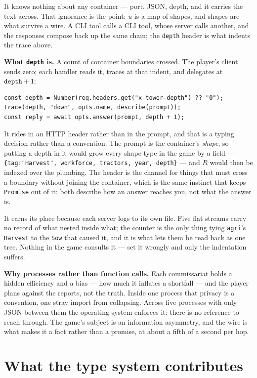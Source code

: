 \documentclass[11pt,a4paper]{article}
\newcommand{\note}[1]{\medskip\noindent\textbf{\textcolor{warn}{#1}}\quad}
\begin{document}
\noindent It knows nothing about any container --- port, JSON, depth, and it
carries the text across. That ignorance is the point: $u$ is a map of shapes,
and shapes are what survive a wire. A CLI tool calls a CLI tool, whose server
calls another, and the responses compose back up the same chain; the
\texttt{depth} header is what indents the trace above.

\note{What \texttt{depth} is.} A count of container boundaries crossed. The
player's client sends zero; each handler reads it, traces at that indent, and
delegates at $\texttt{depth}+1$:

\begin{lstlisting}
const depth = Number(req.headers.get("x-tower-depth") ?? "0");
trace(depth, "down", opts.name, describe(prompt));
const reply = await opts.answer(prompt, depth + 1);
\end{lstlisting}

\noindent It rides in an HTTP header rather than in the prompt, and that is a
typing decision rather than a convention. The prompt is the container's
\emph{shape}, so putting a depth in it would grow every shape type in the game
by a field --- \texttt{\{tag:"Harvest", workforce, tractors, year, depth\}} ---
and $R$ would then be indexed over the plumbing. The header is the channel for
things that must cross a boundary without joining the container, which is the
same instinct that keeps \texttt{Promise} out of it: both describe how an answer
reaches you, not what the answer is.

It earns its place because each server logs to its own file. Five flat streams
carry no record of what nested inside what; the counter is the only thing tying
\texttt{agri}'s \texttt{Harvest} to the \texttt{Sow} that caused it, and it is
what lets them be read back as one tree. Nothing in the game consults it ---
set it wrongly and only the indentation suffers.

\note{Why processes rather than function calls.} Each commissariat holds a
hidden efficiency and a bias --- how much it inflates a shortfall --- and the
player plans against the reports, not the truth. Inside one process that privacy
is a convention, one stray import from collapsing. Across five processes with
only JSON between them the operating system enforces it: there is no reference
to reach through. The game's subject is an information asymmetry, and the wire
is what makes it a fact rather than a promise, at about a fifth of a second per
hop.

\section{What the type system contributes}
\end{document}

